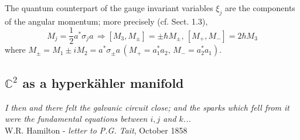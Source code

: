 The quantum counterpart of the gauge invariant variables $\xi_j$ are the components of 
the angular momentum; more precisely (cf. Sect. 1.3),
\begin{equation}
\label{Mj}
M_j = \frac{1}{2}a^*\sigma_j a \, \Rightarrow [M_3, M_\pm] = \pm \hbar M_\pm, \, [M_+, M_-] = 2\hbar M_3 
\end{equation}
where $M_\pm = M_1 \pm iM_2 = a^*\sigma_\pm a \, (M_+ = a_1^* a_2, \, M_- = a_2^* a_1)$.

\smallskip
 
\subsection{${\mathbb C}^2$ as a hyperk\"{a}hler manifold}

\begin{flushright}
{\it I then and there felt the galvanic circuit close; and the sparks which fell
 from it were the fundamental equations between $i, j$ and $k$...}  \\
                        W.R. Hamilton - {\it letter to P.G. Tait}, October 1858
\end{flushright} 
              
\smallskip

